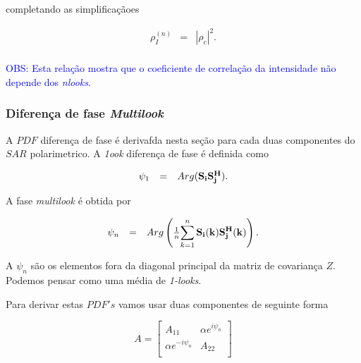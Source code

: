 \documentclass[12pt,a4paper]{article}
\begin{document}
completando as simplificaçãoes

\begin{equation}\label{sec1eqn26}
\begin{array}{ccc}
	\rho_I^{(n)}&=&\left|\rho_c\right|^2. \\
\end{array}
\end{equation}

\textcolor{blue}{OBS: Esta relação mostra que o coeficiente de correlação da intensidade não depende dos {\it nlooks}.}

\subsubsection{Diferença de fase {\it Multilook}}

A $PDF$ diferença de fase é derivafda nesta seção para cada duas componentes do $SAR$ polarimetrico. A {\it 1ook} diferença de fase é definida como 


\begin{equation}\label{sec1eqn27}
\begin{array}{ccc}
	\psi_1&=&Arg({\bf S_iS_j^{H}}). \\
\end{array}
\end{equation}

A fase {\it multilook} é obtida por 

\begin{equation}\label{sec1eqn28}
\begin{array}{ccc}
	\psi_n&=&Arg\left(\frac{1}{n}\displaystyle{\sum_{k=1}^{n}{\bf S_i(k)S_j^{H}(k)}}\right). \\
\end{array}
\end{equation}

A $\psi_n$ são os elementos fora da diagonal principal da matriz de covariança $Z$. Podemos pensar como uma média de {\it 1-looks}.

Para derivar estas $PDF's$ vamos usar duas componentes de seguinte forma

\begin{equation}\label{sec1eqn29}
	A=\left[
\begin{array}{cc}
	A_{11}              & \alpha e^{i\psi_n} \\
	\alpha e^{-i\psi_n} & A_{22} \\
\end{array}\right]
\end{equation}
\end{document}
